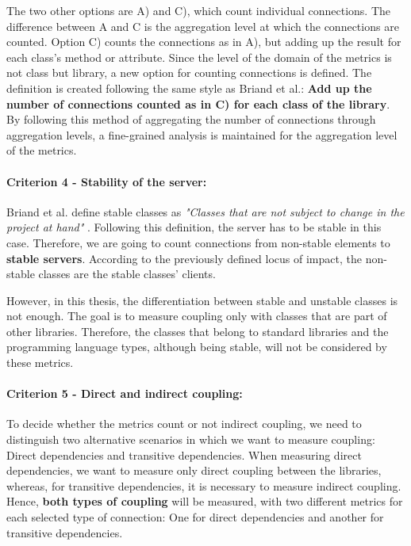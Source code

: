 The two other options are A) and C), which count individual connections. The difference between A and C is the aggregation level at which the connections are counted. Option C) counts the connections as in A), but adding up the result for each class's method or attribute. Since the level of the domain of the metrics is not class but library, a new option for counting connections is defined. The definition is created following the same style as Briand et al.: \textbf{Add up the number of connections counted as in C) for each class of the library}. By following this method of aggregating the number of connections through aggregation levels, a fine-grained analysis is maintained for the aggregation level of the metrics.

\paragraph{Criterion 4 - Stability of the server:}
Briand et al. define stable classes as \textit{"Classes that are not subject to change in the project at hand"} \cite{briand1999unified}. Following this definition, the server has to be stable in this case. Therefore, we are going to count connections from non-stable elements to \textbf{stable servers}. According to the previously defined locus of impact, the non-stable classes are the stable classes' clients.

However, in this thesis, the differentiation between stable and unstable classes is not enough. The goal is to measure coupling only with classes that are part of other libraries. Therefore, the classes that belong to standard libraries and the programming language types, although being stable, will not be considered by these metrics.

\paragraph{Criterion 5 - Direct and indirect coupling:}
To decide whether the metrics count or not indirect coupling, we need to distinguish two alternative scenarios in which we want to measure coupling: Direct dependencies and transitive dependencies. When measuring direct dependencies, we want to measure only direct coupling between the libraries, whereas, for transitive dependencies, it is necessary to measure indirect coupling. Hence, \textbf{both types of coupling} will be measured, with two different metrics for each selected type of connection: One for direct dependencies and another for transitive dependencies.

